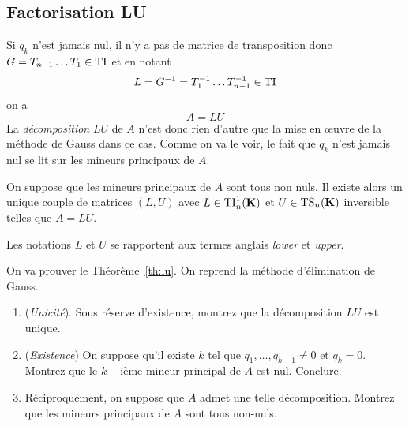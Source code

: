 
\subsection{Factorisation LU}

Si $q_k$ n'est jamais nul, il n'y a pas de matrice de transposition donc $G =
T_{n-1}\dots T_1 \in \mathrm{TI}$ et en notant $$L = G^{-1} = T_1^{-1} \dots
T_{n-1}^{-1} \in \mathrm{TI}$$ on a
\[
A = LU
\]
La \emph{décomposition} $LU$ de $A$ n'est donc rien d'autre que la mise en
\oe uvre de la méthode de Gauss dans ce cas. Comme on va le voir, le fait que
$q_k$ n'est jamais nul se lit sur les mineurs principaux de $A$.

\begin{theorem}
\label{th:lu}
On suppose que les mineurs principaux de $A$ sont tous non nuls. Il existe
alors un unique couple de matrices $(L,U)$ avec $L \in \mathrm{TI}^1_n(\mathbf{K})$ et $U \in
\mathrm{TS}_n(\mathbf{K})$ inversible telles que $A = LU$.
\end{theorem}
\begin{remark}
Les notations $L$ et $U$ se rapportent aux termes anglais \emph{lower} et
\emph{upper}.
\end{remark}
\begin{exercice}
On va prouver le Théorème~\ref{th:lu}. On reprend la méthode d'élimination de
Gauss.
\begin{enumerate}
\item (\emph{Unicité}). Sous réserve d'existence, montrez que la
	décomposition $LU$ est unique.
\item (\emph{Existence}) On suppose qu'il existe $k$ tel que
	$q_1,\dots,q_{k-1} \neq 0$ et $q_k = 0$. Montrez que le $k-$ième mineur
	principal de $A$ est nul. Conclure.
\item Réciproquement, on suppose que $A$ admet une telle décomposition.
	Montrez que les mineurs principaux de $A$ sont tous non-nuls.
\end{enumerate}
\end{exercice}

